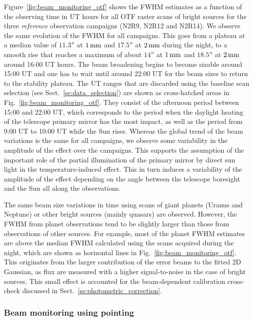 Figure~\ref{fig:beam_monitoring_otf} shows the FWHM estimates as a %
function of the observing time in UT hours for all OTF raster
scans of bright sources for the three \emph{reference} observation
campaigns (N2R9, N2R12 and N2R14). We observe the same evolution of
the FWHM for all campaigns. 
This goes from a plateau at a median value of $11.3''$ at $1\,\rm{mm}$
and $17.5''$ at $2\,\rm{mm}$ during the night, to a smooth rise that
reaches a maximum of about $14''$ at $1\,\rm{mm}$ and $18.5''$ at
$2\,\rm{mm}$ around 16:00 UT
hours. The beam broadening begins to become sizable around 15:00 UT
and one has to wait until around 22:00 UT for the beam sizes to return
to the stability plateau. The UT ranges that are discarded
using the baseline scan selection (see
Sect.~\ref{se:data_selection}) are shown as cross-hatched areas in
Fig.~\ref{fig:beam_monitoring_otf}. They consist of the afternoon
period between 15:00 and 22:00 UT, which corresponds to the period
when the daylight heating of the telescope primary mirror has the most
impact, as well as the period from 9:00 UT to 10:00 UT while the Sun
rises. {\lp Whereas the global trend of the beam variations is the
same for all campaigns, we observe some variability in the amplitude
of the effect over the campaigns. This supports the assumption of the
important role of the partial illumination of the primary mirror by
direct sun light in the temperature-induced effect. This in turn
induces a variability of the amplitude of the effect depending on the
angle between the telescope boresight and the Sun all along the
observations.}

The same beam size variations in time using scans of giant planets
(Uranus and Neptune) or other bright
sources (mainly quasars) are observed. However, the FWHM from planet %
observations tend to be slightly larger than those from observations
of other sources. {\lp For example, most of the planet FWHM estimates
are above the median FWHM calculated using the scans acquired during the
night, which are shown as horizontal lines in Fig.~\ref{fig:beam_monitoring_otf}.}
{\lp This originates from the larger contribution of the
error beams to the fitted 2D Gaussian, as flux are measured with 
a higher signal-to-noise in the case of bright sources.} This small
effect is accounted for the beam-dependent calibration cross-check
discussed in Sect.~\ref{se:photometric_correction}.


\subsubsection{Beam monitoring using pointing}
\label{se:beam_monitoring_pointing}

